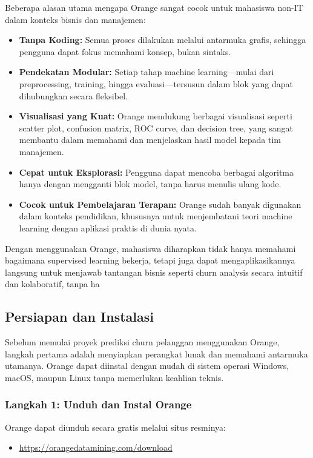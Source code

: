Beberapa alasan utama mengapa Orange sangat cocok untuk mahasiswa non-IT dalam konteks bisnis dan manajemen:
\begin{itemize}
	\item \textbf{Tanpa Koding:} Semua proses dilakukan melalui antarmuka grafis, sehingga pengguna dapat fokus memahami konsep, bukan sintaks.
	\item \textbf{Pendekatan Modular:} Setiap tahap machine learning—mulai dari preprocessing, training, hingga evaluasi—tersusun dalam blok yang dapat dihubungkan secara fleksibel.
	\item \textbf{Visualisasi yang Kuat:} Orange mendukung berbagai visualisasi seperti scatter plot, confusion matrix, ROC curve, dan decision tree, yang sangat membantu dalam memahami dan menjelaskan hasil model kepada tim manajemen.
	\item \textbf{Cepat untuk Eksplorasi:} Pengguna dapat mencoba berbagai algoritma hanya dengan mengganti blok model, tanpa harus menulis ulang kode.
	\item \textbf{Cocok untuk Pembelajaran Terapan:} Orange sudah banyak digunakan dalam konteks pendidikan, khususnya untuk menjembatani teori machine learning dengan aplikasi praktis di dunia nyata.
\end{itemize}

Dengan menggunakan Orange, mahasiswa diharapkan tidak hanya memahami bagaimana supervised learning bekerja, tetapi juga dapat mengaplikasikannya langsung untuk menjawab tantangan bisnis seperti churn analysis secara intuitif dan kolaboratif, tanpa ha

\subsection{Persiapan dan Instalasi}

Sebelum memulai proyek prediksi churn pelanggan menggunakan Orange, langkah pertama adalah menyiapkan perangkat lunak dan memahami antarmuka utamanya. Orange dapat diinstal dengan mudah di sistem operasi Windows, macOS, maupun Linux tanpa memerlukan keahlian teknis.

\subsubsection*{Langkah 1: Unduh dan Instal Orange}

Orange dapat diunduh secara gratis melalui situs resminya:

\begin{itemize}
	\item \url{https://orangedatamining.com/download}
\end{itemize}

